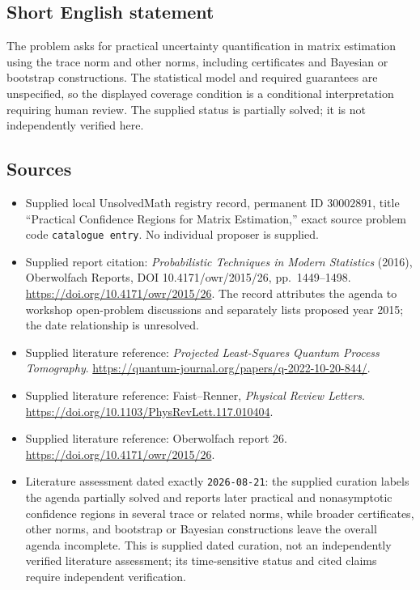 \documentclass[11pt]{article}
\begin{document}
\subsection{Short English statement}
The problem asks for practical uncertainty quantification in matrix estimation using the trace norm and other norms, including certificates and Bayesian or bootstrap constructions. The statistical model and required guarantees are unspecified, so the displayed coverage condition is a conditional interpretation requiring human review. The supplied status is partially solved; it is not independently verified here.
\subsection{Sources}
\begin{itemize}
\item Supplied local UnsolvedMath registry record, permanent ID \(30002891\), title ``Practical Confidence Regions for Matrix Estimation,'' exact source problem code \texttt{catalogue entry}. No individual proposer is supplied.
\item Supplied report citation: \emph{Probabilistic Techniques in Modern Statistics} (2016), Oberwolfach Reports, DOI 10.4171/owr/2015/26, pp.\ 1449--1498. \url{https://doi.org/10.4171/owr/2015/26}. The record attributes the agenda to workshop open-problem discussions and separately lists proposed year 2015; the date relationship is unresolved.
\item Supplied literature reference: \emph{Projected Least-Squares Quantum Process Tomography}. \url{https://quantum-journal.org/papers/q-2022-10-20-844/}.
\item Supplied literature reference: Faist--Renner, \emph{Physical Review Letters}. \url{https://doi.org/10.1103/PhysRevLett.117.010404}.
\item Supplied literature reference: Oberwolfach report 26. \url{https://doi.org/10.4171/owr/2015/26}.
\item Literature assessment dated exactly \texttt{2026-08-21}: the supplied curation labels the agenda partially solved and reports later practical and nonasymptotic confidence regions in several trace or related norms, while broader certificates, other norms, and bootstrap or Bayesian constructions leave the overall agenda incomplete. This is supplied dated curation, not an independently verified literature assessment; its time-sensitive status and cited claims require independent verification.
\end{itemize}
\end{document}
